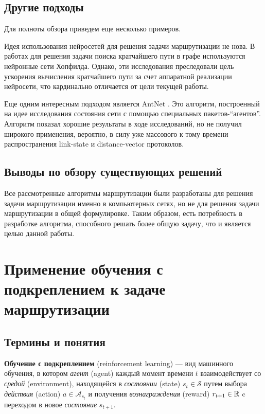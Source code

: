 \documentclass[specification, annotation]{itmo-student-thesis}
\begin{document}
\subsection{Другие подходы}

Для полноты обзора приведем еще несколько примеров.

Идея использования нейросетей для решения задачи маршрутизации не нова. В
работах \cite{ali-nn-routing, araujo2001neural} для решения задачи поиска кратчайшего пути в графе
используются нейронные сети Хопфилда. Однако, эти исследования преследовали цель
ускорения вычисления кратчайшего пути за счет аппаратной реализации нейросети,
что кардинально отличается от цели текущей работы.

Еще одним интересным подходом является AntNet \cite{di1998antnet}. Это алгоритм,
построенный на идее исследования состояния сети с помощью специальных
пакетов-\enquote{агентов}. Алгоритм показал хорошие результаты в ходе исследований, но
не получил широкого применения, вероятно, в силу уже массового к тому времени
распространения link-state и distance-vector протоколов.

\subsection{Выводы по обзору существующих решений}\label{routing-overview-end}

Все рассмотренные алгоритмы маршрутизации были разработаны для
решения задачи маршрутизации именно в компьютерных сетях, но не для решения
задачи маршрутизации в общей формулировке. Таким образом, есть потребность в
разработке алгоритма, способного решать более общую задачу, что и является целью
данной работы.

\section{Применение обучения с подкреплением к задаче маршрутизации}

\subsection{Термины и понятия}

\textbf{Обучение с подкреплением} (reinforcement learning) --- вид машинного
обучения, в котором \textit{агент} (agent) каждый момент времени $t$
взаимодействует со \textit{средой} (environment), находящейся в
\textit{состоянии} (state) $s_t \in \mathcal{S}$ путем выбора
\textit{действия} (action) $a \in \mathcal{A}_{s_t}$ и получения
\textit{вознаграждения} (reward) $r_{t+1} \in \Bbb{R}$ c переходом в новое
\textit{состояние} $s_{t+1}$.
\end{document}
